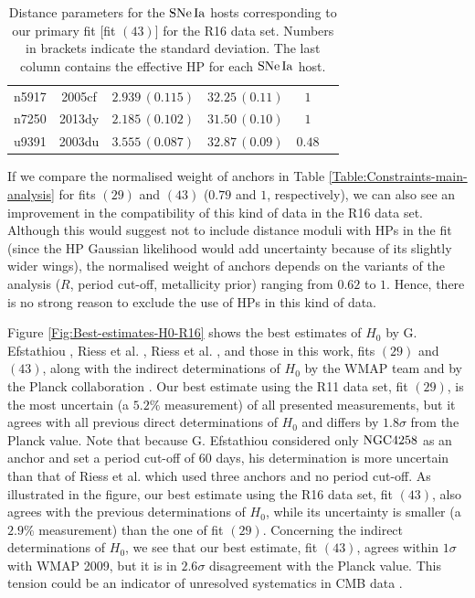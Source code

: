 \begin{table}[tbp]
\begin{tabular}{@{}lccccr}
 n5917 & 2005cf & $2.939\,(0.115)$& $32.25\,(0.11)$& $ 1$ \\
       
 n7250 & 2013dy & $2.185\,(0.102)$& $31.50\,(0.10)$& $ 1$ \\
        
 u9391 & 2003du & $3.555\,(0.087)$& $32.87\,(0.09)$& $ 0.48$ \\
         
\hline
\end{tabular}
\caption{\label{Table:SNIa-HP-fit-43} Distance parameters for the $\mathrm{SNe\,Ia}$ hosts corresponding to our primary fit [fit $(43)$] for the R16 data set. Numbers in brackets indicate the standard deviation. The last column contains the effective HP for each $\mathrm{SNe\,Ia}$ host.}
\end{table}

If we compare the normalised weight of anchors in Table \ref{Table:Constraints-main-analysis} for fits $(29)$ and $(43)$ ($0.79$ and  $1$, respectively), we can also see an improvement in the compatibility of this kind of data in the R16 data set. Although this would suggest not to include distance moduli with HPs in the fit (since the HP Gaussian likelihood would add uncertainty because of its slightly wider wings), the normalised weight of anchors depends on the variants of the analysis ($R$, period cut-off, metallicity prior) ranging from $0.62$ to $1$. Hence, there is no strong reason to exclude the use of HPs in this kind of data. 

Figure \ref{Fig:Best-estimates-H0-R16} shows the best estimates of $H_0$ by G. Efstathiou \cite{Efstathiou:2013via}, Riess et al. \cite{Riess:2011yx}, Riess et al. \cite{Riess:2016jrr}, and those in this work, fits $(29)$ and $(43)$, along with the indirect determinations of $H_0$ by the WMAP team \cite{Hinshaw:2012aka} and by the Planck collaboration \cite{Ade:2015xua}. Our best estimate using the R11 data set, fit $(29)$, is the most uncertain (a $5.2\%$ measurement) of all presented measurements, but it agrees with all previous direct determinations of $H_0$ and differs by $1.8\sigma$ from the Planck value. Note that because G. Efstathiou considered only $\mathrm{NGC4258}$ as an anchor and set a period cut-off of $60$ days, his determination is more uncertain than that of Riess et al. \cite{Riess:2011yx} which used three anchors and no period cut-off. As illustrated in the figure, our best estimate using the R16 data set, fit $(43)$, also agrees with the previous determinations of $H_0$, while its uncertainty is smaller (a $2.9\%$ measurement) than the one of fit $(29)$. Concerning the indirect determinations of $H_0$, we see that our best estimate, fit $(43)$, agrees within $1\sigma$ with WMAP 2009, but it is in $2.6\sigma$ disagreement with the Planck value. This tension could be an indicator of unresolved systematics in CMB data \cite{Riess:2016jrr}. 

